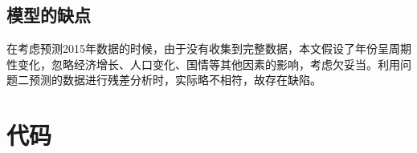 \documentclass{whutmod}
\begin{document}
	\subsection{模型的缺点}
	在考虑预测2015年数据的时候，由于没有收集到完整数据，本文假设了年份呈周期性变化，忽略经济增长、人口变化、国情等其他因素的影响，考虑欠妥当。利用问题二预测的数据进行残差分析时，实际略不相符，故存在缺陷。

	
	
	\newpage	%
	
	\printbibliography[title = {参考文献}]	%
	
	
	\newpage
	\appendix %
	\section{代码}
\end{document}
